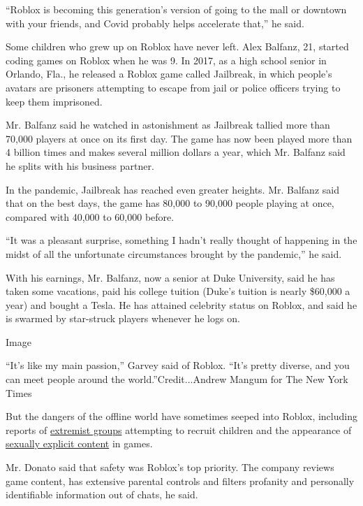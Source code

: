 ``Roblox is becoming this generation's version of going to the mall or
downtown with your friends, and Covid probably helps accelerate that,''
he said.

Some children who grew up on Roblox have never left. Alex Balfanz, 21,
started coding games on Roblox when he was 9. In 2017, as a high school
senior in Orlando, Fla., he released a Roblox game called Jailbreak, in
which people's avatars are prisoners attempting to escape from jail or
police officers trying to keep them imprisoned.

Mr. Balfanz said he watched in astonishment as Jailbreak tallied more
than 70,000 players at once on its first day. The game has now been
played more than 4 billion times and makes several million dollars a
year, which Mr. Balfanz said he splits with his business partner.

In the pandemic, Jailbreak has reached even greater heights. Mr. Balfanz
said that on the best days, the game has 80,000 to 90,000 people playing
at once, compared with 40,000 to 60,000 before.

``It was a pleasant surprise, something I hadn't really thought of
happening in the midst of all the unfortunate circumstances brought by
the pandemic,'' he said.

With his earnings, Mr. Balfanz, now a senior at Duke University, said he
has taken some vacations, paid his college tuition (Duke's tuition is
nearly \$60,000 a year) and bought a Tesla. He has attained celebrity
status on Roblox, and said he is swarmed by star-struck players whenever
he logs on.

Image

``It's like my main passion,'' Garvey said of Roblox. ``It's pretty
diverse, and you can meet people around the world.''Credit...Andrew
Mangum for The New York Times

But the dangers of the offline world have sometimes seeped into Roblox,
including reports of
\href{https://www.nbcnews.com/tech/tech-news/extremists-creep-roblox-online-game-popular-children-n1045056}{extremist
groups} attempting to recruit children and the appearance of
\href{https://techcrunch.com/2018/07/18/roblox-responds-to-the-hack-that-allowed-a-childs-avatar-to-be-raped-in-its-game/}{sexually
explicit content} in games.

Mr. Donato said that safety was Roblox's top priority. The company
reviews game content, has extensive parental controls and filters
profanity and personally identifiable information out of chats, he said.

